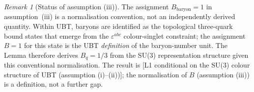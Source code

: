 \documentclass[12pt,a4paper]{article}
\theoremstyle{definition}
\theoremstyle{remark}
\newtheorem{remark}[theorem]{Remark}
\begin{document}
\begin{remark}[Status of assumption (iii)]
\label{rem:Bbaryon_convention}
The assignment $B_{\mathrm{baryon}}=1$ in assumption~(iii) is a normalisation
convention, not an independently derived quantity.  Within UBT, baryons are
identified as the topological three-quark bound states that emerge from the
$\varepsilon^{abc}$ colour-singlet constraint; the assignment $B=1$ for this
state is the UBT \emph{definition} of the baryon-number unit.
The Lemma therefore derives $B_q=1/3$ from the SU(3) representation structure
given this conventional normalisation.  The result is [L1 conditional on the
SU(3) colour structure of UBT (assumption (i)–(ii))]; the normalisation
of $B$ (assumption (iii)) is a definition, not a further gap.
\end{remark}
\end{document}
